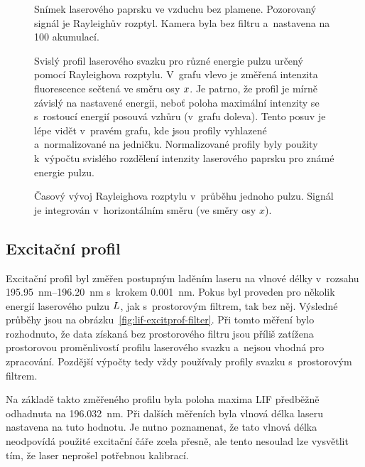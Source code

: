 \begin{figure}[htp]
	\centering
	
	\caption{Snímek laserového paprsku ve vzduchu bez plamene.
		Pozorovaný signál je Rayleighův rozptyl.
		Kamera byla bez filtru a~nastavena na \num{100} akumulací.}
	\label{fig:lif-beam}
\end{figure}

\begin{figure}
	\centering
	\hfill
	
	\caption{Svislý profil laserového svazku pro různé energie pulzu
		určený pomocí Rayleighova rozptylu.
		V~grafu vlevo je změřená intenzita fluorescence sečtená
		ve směru osy $x$.
		Je patrno, že profil je mírně závislý na nastavené energii,
		neboť poloha maximální intenzity se s~rostoucí energií posouvá
		vzhůru (v~grafu doleva).
		Tento posuv je lépe vidět v~pravém grafu, kde jsou profily
		vyhlazené a~normalizované na jedničku.
		Normalizované profily byly použity k~výpočtu svislého
		rozdělení intenzity laserového paprsku pro známé energie pulzu.}
	\label{fig:lif-rayleigh-profile}
\end{figure}

\begin{figure}
	\centerline{}
	\caption{Časový vývoj Rayleighova rozptylu v~průběhu jednoho pulzu.
		Signál je integrován v~horizontálním směru (ve směry osy $x$).}
	\label{fig:lif-rayleigh-time}
\end{figure}

\subsection{Excitační profil}
\label{sec:lif-excitprof}
Excitační profil byl změřen postupným laděním laseru na vlnové délky
v~rozsahu \SIrange{195.95}{196.20}{\nano\metre}
s~krokem \SI{0.001}{\nano\metre}.
Pokus byl proveden pro několik energií laserového pulzu $L$,
jak s~prostorovým filtrem, tak bez něj.
Výsledné průběhy jsou na obrázku~\ref{fig:lif-excitprof-filter}.
Při tomto měření bylo rozhodnuto, že data získaná bez prostorového
filtru jsou příliš zatížena prostorovou proměnlivostí profilu laserového
svazku a~nejsou vhodná pro zpracování.
Pozdější výpočty tedy vždy používaly profily svazku s~prostorovým filtrem.

Na základě takto změřeného profilu byla poloha maxima LIF předběžně
odhadnuta na \SI{196.032}{\nano\metre}.
Při dalších měřeních byla vlnová délka laseru na\-stavena na tuto hodnotu.
Je nutno poznamenat, že tato vlnová délka neodpovídá použité excitační čáře
zcela přesně, ale tento nesoulad lze vysvětlit tím,
že laser neprošel potřebnou kalibrací.

